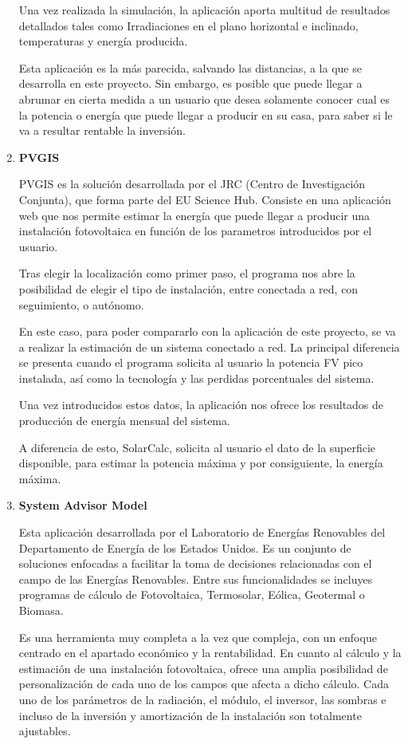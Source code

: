 \begin{enumerate}
Una vez realizada la simulación, la aplicación aporta multitud de resultados detallados tales como Irradiaciones en el plano horizontal e inclinado, temperaturas y energía producida.

Esta aplicación es la más parecida, salvando las distancias, a la que se desarrolla en este proyecto. Sin embargo, es posible que puede llegar a abrumar en cierta medida a un usuario que desea solamente conocer cual es la potencia o energía que puede llegar a producir en su casa, para saber si le va a resultar rentable la inversión.

\item \textbf{PVGIS} \cite{sota_pvgis}

PVGIS es la solución desarrollada por el JRC (Centro de Investigación Conjunta), que forma parte del EU Science Hub. Consiste en una aplicación web que nos permite estimar la energía que puede llegar a producir una instalación fotovoltaica en función de los parametros introducidos por el usuario.

Tras elegir la localización como primer paso, el programa nos abre la posibilidad de elegir el tipo de instalación, entre conectada a red, con seguimiento, o autónomo.

En este caso, para poder compararlo con la aplicación de este proyecto, se va a realizar la estimación de un sistema conectado a red. La principal diferencia se presenta cuando el programa solicita al usuario la potencia FV pico instalada, así como la tecnología y las perdidas porcentuales del sistema.

Una vez introducidos estos datos, la aplicación nos ofrece los resultados de producción de energía mensual del sistema.

A diferencia de esto, SolarCalc, solicita al usuario el dato de la superficie disponible, para estimar la potencia máxima y por consiguiente, la energía máxima.

\item \textbf{System Advisor Model} \cite{sota_sam}

Esta aplicación desarrollada por el Laboratorio de Energías Renovables del Departamento de Energía de los Estados Unidos. Es un conjunto de soluciones enfocadas a facilitar la toma de decisiones relacionadas con el campo de las Energías Renovables. Entre sus funcionalidades se incluyes programas de cálculo de Fotovoltaica, Termosolar, Eólica, Geotermal o Biomasa.

Es una herramienta muy completa a la vez que compleja, con un enfoque centrado en el apartado económico y la rentabilidad. En cuanto al cálculo y la estimación de una instalación fotovoltaica, ofrece una amplia posibilidad de personalización de cada uno de los campos que afecta a dicho cálculo. Cada uno de los parámetros de la radiación, el módulo, el inversor, las sombras e incluso de la inversión y amortización de la instalación son totalmente ajustables.


\end{enumerate}
